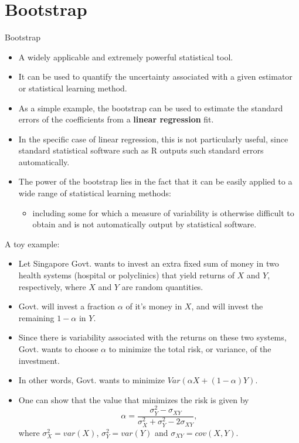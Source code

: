 \documentclass[
  ignorenonframetext,
]{beamer}
\providecommand{\tightlist}{%
  \setlength{\itemsep}{0pt}\setlength{\parskip}{0pt}}
\begin{document}
\section{Bootstrap}\label{bootstrap}

\begin{frame}{Bootstrap}
\label{bootstrap-1}
\begin{itemize}
\tightlist
\item
  A {widely applicable and extremely powerful} statistical tool.
\item
  It can be used to {quantify the uncertainty associated with a given
  estimator} or statistical learning method.
\item
  As a simple example, the bootstrap can be used {to estimate the
  standard errors of the coefficients} from a \textbf{linear regression}
  fit.
\item
  In the specific {case of linear regression, this is not particularly
  useful}, since standard statistical software such as R outputs such
  standard errors automatically.
\item
  The power of the bootstrap lies in the fact that it can be easily
  applied to {a wide range of statistical learning methods:}

  \begin{itemize}
  \tightlist
  \item
    including some for which {a measure of variability is otherwise
    difficult to obtain} and is not automatically output by statistical
    software.
  \end{itemize}
\end{itemize}
\end{frame}

\begin{frame}{A toy example:}
\label{a-toy-example}
\begin{itemize}
\tightlist
\item
  Let Singapore Govt. wants to {invest an extra fixed sum of money in
  two health systems (hospital or polyclinics)} that yield returns of
  \(X\) and \(Y\), respectively, where \(X\) and \(Y\) are random
  quantities.
\item
  Govt. will invest a {fraction \(\alpha\) of it's money in \(X\)}, and
  will invest the {remaining \(1 - \alpha\) in \(Y\).}
\item
  Since there is variability associated with the returns on these two
  systems, Govt. wants to {choose \(\alpha\) to minimize the total risk,
  or variance,} of the investment.
\item
  In other words, Govt. wants to minimize
  \(Var(\alpha X + (1 -\alpha)Y )\).
\item
  One can show that the value that minimizes the risk is given by
  \[\alpha = \frac{\sigma_{Y}^2 - \sigma_{XY}}{\sigma_{X}^2 + \sigma_{Y}^2 - 2\sigma_{XY}},\]
  where \(\sigma_{X}^2 = var(X)\), \(\sigma_{Y}^2 = var(Y)\) and
  \(\sigma_{XY} = cov(X, Y)\).
\end{itemize}
\end{frame}
\end{document}
